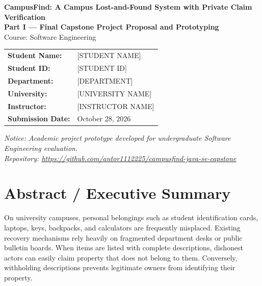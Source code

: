 \documentclass[11pt,a4paper]{article}
\begin{document}
\begin{titlepage}
    \centering
    \vspace*{1.5cm}
    
    {\Huge \textbf{CampusFind: A Campus Lost-and-Found System with Private Claim Verification}}\\[1.5cm]
    
    {\Large \textbf{Part I — Final Capstone Project Proposal and Prototyping}}\\[0.8cm]
    {\large Course: Software Engineering}\\[2.5cm]
    
    \begin{tabular}{ll}
        \textbf{Student Name:} & [STUDENT NAME] \\
        \textbf{Student ID:} & [STUDENT ID] \\
        \textbf{Department:} & [DEPARTMENT] \\
        \textbf{University:} & [UNIVERSITY NAME] \\
        \textbf{Instructor:} & [INSTRUCTOR NAME] \\
        \textbf{Submission Date:} & October 28, 2026 \\
    \end{tabular}
    
    \vfill
    {\footnotesize \textit{Notice: Academic project prototype developed for undergraduate Software Engineering evaluation.}}\\
    {\footnotesize \textit{Repository: \url{https://github.com/antor1112225/campusfind-java-se-capstone}}}
\end{titlepage}

\tableofcontents
\newpage
{}

\section{Abstract / Executive Summary}
On university campuses, personal belongings such as student identification cards, laptops, keys, backpacks, and calculators are frequently misplaced. Existing recovery mechanisms rely heavily on fragmented department desks or public bulletin boards. When items are listed with complete descriptions, dishonest actors can easily claim property that does not belong to them. Conversely, withholding descriptions prevents legitimate owners from identifying their property.
\end{document}
